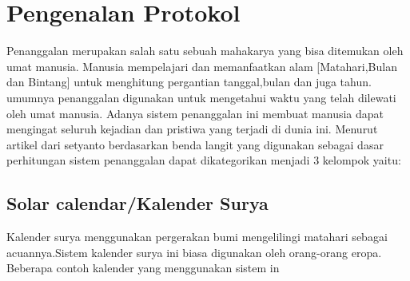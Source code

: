 

\section{Pengenalan Protokol} 
  Penanggalan merupakan salah satu sebuah mahakarya yang bisa ditemukan oleh umat manusia. Manusia mempelajari dan memanfaatkan alam [Matahari,Bulan dan Bintang] untuk menghitung pergantian tanggal,bulan dan juga tahun. 
umumnya penanggalan digunakan untuk mengetahui waktu yang telah dilewati oleh umat manusia. Adanya sistem penanggalan ini membuat manusia dapat mengingat seluruh kejadian dan pristiwa yang terjadi di dunia ini. 
Menurut artikel dari setyanto berdasarkan benda langit yang digunakan sebagai dasar perhitungan sistem penanggalan dapat dikategorikan menjadi 3 kelompok yaitu:\cite{setyanto2015kriteria} 

  \subsection{} 
   
    
  \subsection{Solar calendar/Kalender Surya} 
    Kalender surya menggunakan pergerakan bumi mengelilingi matahari sebagai acuannya.Sistem kalender surya ini biasa digunakan oleh orang-orang eropa. Beberapa contoh kalender yang menggunakan sistem in
